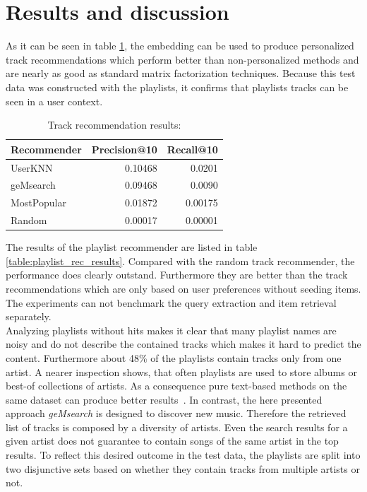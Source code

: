 \documentclass[sigconf]{acmart}
\begin{document}
\section{Results and discussion}

As it can be seen in table \ref{table:track_rec_results}, the embedding can be used to produce personalized track recommendations which perform better than non-personalized methods and are nearly as good as standard matrix factorization techniques. Because this test data was constructed with the playlists, it confirms that playlists tracks can be seen in a user context.

\begin{table}[H]
	\caption{Track recommendation results:}
	\label{table:track_rec_results}
	\begin{tabular}{lrr}
		\midrule 
		\textbf{Recommender} & \textbf{Precision@10} & \textbf{Recall@10} \\ 
		\midrule 
		UserKNN   & 0.10468 & 0.0201  \\
		geMsearch   &  0.09468 &  0.0090  \\ %
		MostPopular   & 0.01872 & 0.00175  \\
		Random   & 0.00017 & 0.00001  \\
		\bottomrule
	\end{tabular}
\end{table}

The results of the playlist recommender are listed in table \ref{table:playlist_rec_results}. Compared with the random track recommender, the performance does clearly outstand. Furthermore they are better than the track recommendations which are only based on user preferences without seeding items. The experiments can not benchmark the query extraction and item retrieval separately.  \\

Analyzing playlists without hits makes it clear that many playlist names are noisy and do not describe the contained tracks which makes it hard to predict the content. Furthermore about 48\% of the playlists contain tracks only from one artist. A nearer inspection shows, that often playlists are used to store albums or best-of collections of artists. As a consequence pure text-based methods on the same dataset can produce better results~\cite{chungexploiting}. In contrast, the here presented approach \emph{geMsearch} is designed to discover new music. Therefore the retrieved list of tracks is composed by a diversity of artists. Even the search results for a given artist does not guarantee to contain songs of the same artist in the top results. To reflect this desired outcome in the test data, the playlists are split into two disjunctive sets based on whether they contain tracks from multiple artists or not.
\end{document}
